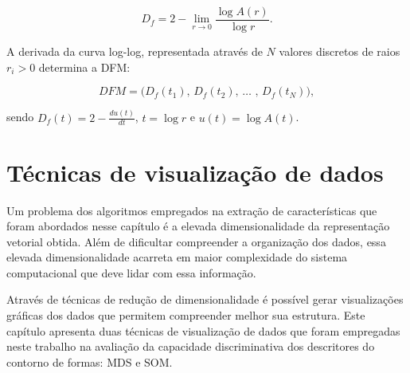 \begin{equation}
D_f = 2 - \lim_{r \to 0}  \frac{\log{A(r)}}{\log{r}}.
\label{eq:df}
\end{equation}

A derivada da curva log-log, representada através de $N$ valores discretos de raios $r_i>0$ determina a \ac{DFM}:

\begin{equation}
DFM = \big(D_f(t_1)\text{, }D_f(t_2)\text{, }\ldots\text{ , }D_f(t_N)\big), 
\label{eq:dfm}
\end{equation}

\noindent sendo  $D_f(t) = 2 - \frac{du(t)}{dt}$, $t = \log{r}$ e $u(t) = \log{A(t)}$.


\section{Técnicas de visualização de dados}

Um problema dos algoritmos empregados na extração de características que foram abordados nesse capítulo é a elevada dimensionalidade da representação vetorial obtida. Além de dificultar compreender a organização dos dados, essa elevada dimensionalidade acarreta em maior complexidade do sistema computacional que deve lidar com essa informação. 

Através de técnicas de redução de dimensionalidade é possível gerar visualizações gráficas dos dados que permitem compreender melhor sua estrutura. Este capítulo apresenta duas técnicas de visualização de dados que foram empregadas neste trabalho na avaliação da capacidade discriminativa dos descritores do contorno de formas: \acf{MDS} e \acf{SOM}.



